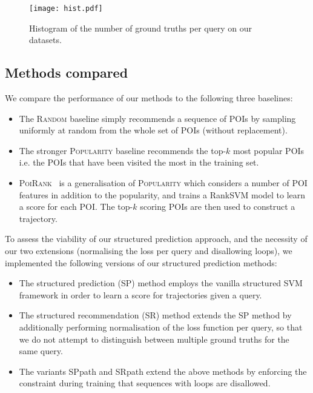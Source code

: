 \begin{figure*}[t]
	\centering
	\texttt{[image: hist.pdf]}
	\caption{Histogram of the number of ground truths per query on our datasets.}
	\label{fig:hist}
\end{figure*}


%
\subsection{Methods compared}

We compare the performance of our methods to the following three baselines:
\begin{itemize}[leftmargin=0.125in]
	\item The \textsc{Random} baseline simply recommends a sequence of POIs by sampling uniformly at random from the whole set of POIs (without replacement).
	
	\item The stronger \textsc{Popularity} baseline recommends the top-$k$ most popular POIs i.e. the POIs that have been visited the most in the training set.

	\item \textsc{PoiRank}~\cite{cikm16paper} is a generalisation of \textsc{Popularity} which considers a number of POI features in addition to the popularity,
and trains a RankSVM model to learn a score for each POI. The top-$k$ scoring POIs are then used to construct a trajectory.
\end{itemize}

To assess the viability of our structured prediction approach, and the necessity of our two extensions (normalising the loss per query and disallowing loops), we implemented the following versions of our structured prediction methods:
\begin{itemize}[leftmargin=0.125in]
	\item The structured prediction ({\sc SP}) method employs the vanilla structured SVM framework in order to learn a score for trajectories given a query.

	\item The structured recommendation ({\sc SR}) method extends the {\sc SP} method by additionally performing normalisation of the loss function per query,
	so that we do not attempt to distinguish between multiple ground truths for the same query.

	\item The variants {\sc SPpath} and {\sc SRpath} extend the above methods by enforcing the constraint during training that sequences with loops are disallowed.
\end{itemize}


